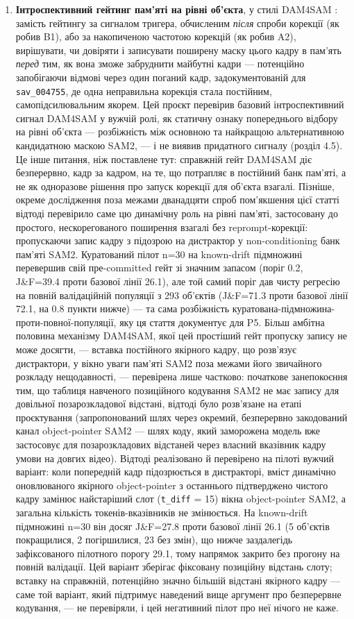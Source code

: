 \documentclass[11pt]{article}
\begin{document}
\begin{enumerate}
\item \textbf{Інтроспективний гейтинг пам'яті на рівні об'єкта}, у стилі DAM4SAM \citep{videnovic2024}: замість гейтингу за сигналом тригера, обчисленим \emph{після} спроби корекції (як робив B1), або за накопиченою частотою корекцій (як робив A2), вирішувати, чи довіряти і записувати поширену маску цього кадру в пам'ять \emph{перед} тим, як вона зможе забруднити майбутні кадри --- потенційно запобігаючи відмові через один поганий кадр, задокументованій для \texttt{sav\_004755}, де одна неправильна корекція стала постійним, самопідсилювальним якорем. Цей проєкт перевірив базовий інтроспективний сигнал DAM4SAM у вужчій ролі, як статичну ознаку попереднього відбору на рівні об'єкта --- розбіжність між основною та найкращою альтернативною кандидатною маскою SAM2, --- і не виявив придатного сигналу (розділ 4.5). Це інше питання, ніж поставлене тут: справжній гейт DAM4SAM діє безперервно, кадр за кадром, на те, що потрапляє в постійний банк пам'яті, а не як одноразове рішення про запуск корекції для об'єкта взагалі. Пізніше, окреме дослідження поза межами дванадцяти спроб пом'якшення цієї статті відтоді перевірило саме цю динамічну роль на рівні пам'яті, застосовану до простого, нескорегованого поширення взагалі без reprompt-корекції: пропускаючи запис кадру з підозрою на дистрактор у non-conditioning банк пам'яті SAM2. Куратований пілот n=30 на known-drift підмножині перевершив свій пре-committed гейт зі значним запасом (поріг 0.2, J\&F=39.4 проти базової лінії 26.1), але той самий поріг дав чисту регресію на повній валідаційній популяції з 293 об'єктів (J\&F=71.3 проти базової лінії 72.1, на 0.8 пункти нижче) --- та сама розбіжність куратована-підмножина-проти-повної-популяції, яку ця стаття документує для P5. Більш амбітна половина механізму DAM4SAM, якої цей простіший гейт пропуску запису не може досягти, --- вставка постійного якірного кадру, що розв'язує дистрактори, у вікно уваги пам'яті SAM2 поза межами його звичайного розкладу нещодавності, --- перевірена лише частково: початкове занепокоєння тим, що таблиця навченого позиційного кодування SAM2 не має запису для довільної позарозкладової відстані, відтоді було розв'язане на етапі проєктування (запропонований шлях через окремий, безперервно закодований канал object-pointer SAM2 --- шлях коду, який заморожена модель вже застосовує для позарозкладових відстаней через власний вказівник кадру умови на довгих відео). Відтоді реалізовано й перевірено на пілоті вужчий варіант: коли попередній кадр підозрюється в дистракторі, вміст динамічно оновлюваного якірного object-pointer з останнього підтверджено чистого кадру замінює найстаріший слот (\texttt{t\_diff} = 15) вікна object-pointer SAM2, а загальна кількість токенів-вказівників не змінюється. На known-drift підмножині n=30 він досяг J\&F=27.8 проти базової лінії 26.1 (5 об'єктів покращилися, 2 погіршилися, 23 без змін), що нижче заздалегідь зафіксованого пілотного порогу 29.1, тому напрямок закрито без прогону на повній валідації. Цей варіант зберігає фіксовану позиційну відстань слоту; вставку на справжній, потенційно значно більшій відстані якірного кадру — саме той варіант, який підтримує наведений вище аргумент про безперервне кодування, — не перевіряли, і цей негативний пілот про неї нічого не каже.

\end{enumerate}
\end{document}
